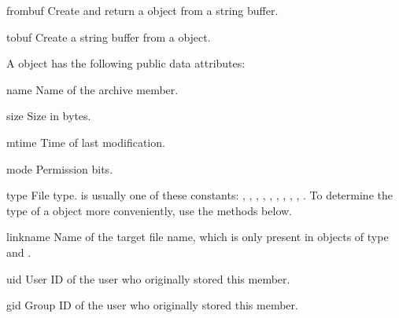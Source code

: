 \begin{methoddesc}{frombuf}{}
    Create and return a  object from a string buffer.
\end{methoddesc}

\begin{methoddesc}{tobuf}{}
    Create a string buffer from a  object.
\end{methoddesc}

A  object has the following public data attributes:

\begin{memberdesc}{name}
    Name of the archive member.
\end{memberdesc}

\begin{memberdesc}{size}
    Size in bytes.
\end{memberdesc}

\begin{memberdesc}{mtime}
    Time of last modification.
\end{memberdesc}

\begin{memberdesc}{mode}
    Permission bits.
\end{memberdesc}

\begin{memberdesc}{type}
    File type.   is usually one of these constants:
    , , ,
    , , ,
    , , ,
    .  To determine the type of a
     object more conveniently, use the 
    methods below.
\end{memberdesc}

\begin{memberdesc}{linkname}
    Name of the target file name, which is only present in
     objects of type  and
    .
\end{memberdesc}

\begin{memberdesc}{uid}
    User ID of the user who originally stored this member.
\end{memberdesc}

\begin{memberdesc}{gid}
    Group ID of the user who originally stored this member.
\end{memberdesc}

